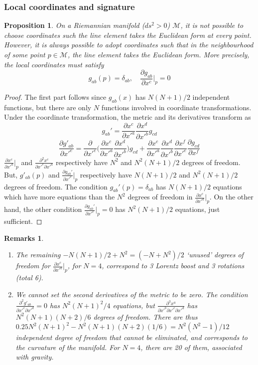 \documentclass[a4paper]{article}
\newtheorem{remarks}{Remarks}[section]
\theoremstyle{new}
\newtheorem{prop}{Proposition}[section]
\begin{document}
\subsubsection{Local coordinates and signature}
\begin{prop}\label{localcoordprop1}
On a Riemannian manifold ($ds^2>0$) $\mathcal{M}$, it is not possible to choose coordinates such the line element takes the Euclidean form at every point. However, it is always possible to adopt coordinates such that in the neighbourhood of some point $p\in\mathcal{M}$, the line element takes the Euclidean form. More precisely, the local coordinates must satisfy
\begin{equation}
g_{ab}(p)=\delta_{ab},\quad\frac{\partial g_{ab}}{\partial x^c}\bigg|_p=0\label{localcoord}
\end{equation}
\end{prop}
\begin{proof}
The first part follows since $g_{ab}(x)$ has $N(N + 1)/2$ independent functions, but there are only $N$ functions involved in coordinate transformations. Under the coordinate transformation, the metric and its derivatives transform as
$$g_{ab}'=\frac{\partial x^c}{\partial x'^a}\frac{\partial x^d}{\partial x'^b}g_{cd}$$
$$\frac{\partial g'_{ab}}{\partial x'^e}=\frac{\partial}{\partial x'^e}\bigg(\frac{\partial x^c}{\partial x'^a}\frac{\partial x^d}{\partial x'^b}\bigg)g_{cd}+\frac{\partial x^c}{\partial x'^a}\frac{\partial x^d}{\partial x'^b}\frac{\partial x^f}{\partial x'^e}\frac{\partial g_{cd}}{\partial x^f}$$
$\frac{\partial x^c}{\partial x'^a}|_p$ and $\frac{\partial^2x^c}{\partial x'^e\partial x'^a}$ respectively have $N^2$ and $N^2(N+1)/2$ degrees of freedom. But, $g'_{ab}(p)$ and $\frac{\partial g_{ab}'}{\partial x'^c}|_p$ respectively have $N(N+1)/2$ and $N^2(N+1)/2$ degrees of freedom. The condition $g_{ab}'(p)=\delta_{ab}$ has $N(N+1)/2$ equations which have more equations than the $N^2$ degrees of freedom in $\frac{\partial x^c}{\partial x'^a}|_p$. On the other hand, the other condition $\frac{\partial g_{ab}'}{\partial x'^c}|_p=0$ has $N^2(N+1)/2$ equations, just sufficient.
\end{proof}
\begin{remarks}\leavevmode
\begin{enumerate}
    \item The remaining $-N(N+1)/2+N^2=(-N+N^2)/2$ `unused' degrees of freedom for $\frac{\partial x^c}{\partial x'^a}|_p$, for $N=4$, correspond to 3 Lorentz boost and 3 rotations (total 6).
    \item We cannot set the second derivatives of the metric to be zero. The condition $\frac{\partial^2g'_{ab}}{\partial x'^c\partial x'^d}=0$ has $N^2(N+1)^2/4$ equations, but $\frac{\partial^3x^a}{\partial x'^b\partial x'^c\partial x'^d}$ has $N^2(N+1)(N+2)/6$ degrees of freedom. There are thus $0.25N^2(N+1)^2-N^2(N+1)(N+2)(1/6)=N^2(N^2-1)/12$ independent degree of freedom that cannot be eliminated, and corresponds to the curvature of the manifold. For $N=4$, there are 20 of them, associated with gravity.
\end{enumerate}
\end{remarks}
\end{document}
